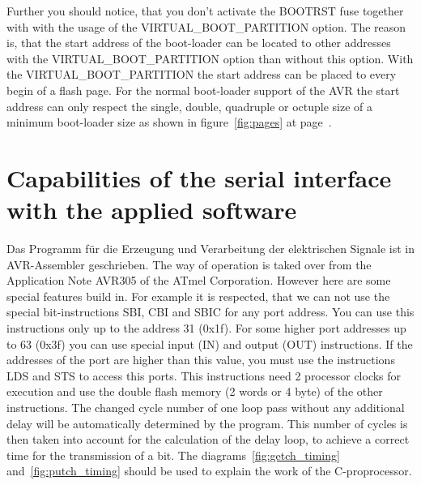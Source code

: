 Further you should notice, that you don't activate the BOOTRST fuse together with
with the usage of the VIRTUAL\_BOOT\_PARTITION option.
The reason is, that the start address of the boot-loader can be located to other
addresses with the VIRTUAL\_BOOT\_PARTITION option than without this option.
With the VIRTUAL\_BOOT\_PARTITION the start address can be placed to every
begin of a flash page. For the normal boot-loader support of the AVR the
start address can only respect the single, double, quadruple or octuple size of
a minimum boot-loader size as shown in figure~\ref{fig:pages} at page~\pageref{fig:pages}.


\section{Capabilities of the serial interface with the applied software}

Das Programm für die Erzeugung und Verarbeitung der elektrischen Signale ist in AVR-Assembler geschrieben.
The way of operation is taked over from the Application Note AVR305 of the ATmel Corporation.
However here are some special features build in.
For example it is respected, that we can not use the special bit-instructions SBI, CBI and SBIC for
any port address. You can use this instructions only up to the address 31 (0x1f).
For some higher port addresses up to 63 (0x3f) you can use special input (IN) and output (OUT)
instructions. If the addresses of the port are higher than this value, you must use
the instructions LDS and STS to access this ports. This instructions need 2 processor clocks for
execution and use the double flash memory (2 words or 4 byte) of the other instructions.
The changed cycle number of one loop pass without any additional delay will be automatically
determined by the program. 
This number of cycles is then taken into account for the calculation of the delay loop,
to achieve a correct time for the transmission of a bit.
The diagrams~\ref{fig:getch_timing} and~\ref{fig:putch_timing} should be used to
explain the work of the C-proprocessor.

